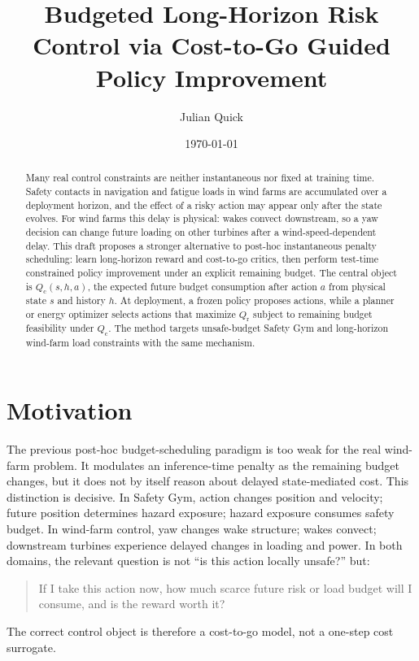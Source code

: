 \documentclass[11pt]{article}
\title{Budgeted Long-Horizon Risk Control via Cost-to-Go Guided Policy Improvement}
\author{Julian Quick}
\date{\today}
\newcommand{\Qr}{Q_{\mathrm r}}
\newcommand{\Qc}{Q_{\mathrm c}}
\begin{document}
\maketitle

\begin{abstract}
Many real control constraints are neither instantaneous nor fixed at training time.
Safety contacts in navigation and fatigue loads in wind farms are accumulated over a deployment horizon, and the effect of a risky action may appear only after the state evolves.
For wind farms this delay is physical: wakes convect downstream, so a yaw decision can change future loading on other turbines after a wind-speed-dependent delay.
This draft proposes a stronger alternative to post-hoc instantaneous penalty scheduling: learn long-horizon reward and cost-to-go critics, then perform test-time constrained policy improvement under an explicit remaining budget.
The central object is $\Qc(s,h,a)$, the expected future budget consumption after action $a$ from physical state $s$ and history $h$.
At deployment, a frozen policy proposes actions, while a planner or energy optimizer selects actions that maximize $\Qr$ subject to remaining budget feasibility under $\Qc$.
The method targets unsafe-budget Safety Gym and long-horizon wind-farm load constraints with the same mechanism.
\end{abstract}

\section{Motivation}

The previous post-hoc budget-scheduling paradigm is too weak for the real wind-farm problem.
It modulates an inference-time penalty as the remaining budget changes, but it does not by itself reason about delayed state-mediated cost.
This distinction is decisive.
In Safety Gym, action changes position and velocity; future position determines hazard exposure; hazard exposure consumes safety budget.
In wind-farm control, yaw changes wake structure; wakes convect; downstream turbines experience delayed changes in loading and power.
In both domains, the relevant question is not ``is this action locally unsafe?'' but:
\begin{quote}
If I take this action now, how much scarce future risk or load budget will I consume, and is the reward worth it?
\end{quote}

The correct control object is therefore a cost-to-go model, not a one-step cost surrogate.
\end{document}
